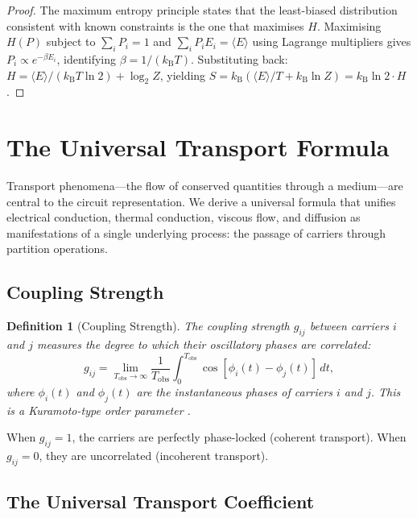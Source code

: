 \documentclass[twocolumn,10pt]{article}
\newtheorem{definition}[theorem]{Definition}
\theoremstyle{remark}
\newcommand{\kB}{k_{\mathrm{B}}}
\begin{document}
\begin{proof}
The maximum entropy principle \cite{jaynes1957a,jaynes1957b} states that the least-biased distribution consistent with known constraints is the one that maximises $H$.  Maximising $H(P)$ subject to $\sum_i P_i = 1$ and $\sum_i P_i E_i = \langle E \rangle$ using Lagrange multipliers gives $P_i \propto e^{-\beta E_i}$, identifying $\beta = 1/(\kB T)$.  Substituting back: $H = \langle E \rangle / (\kB T \ln 2) + \log_2 Z$, yielding $S = \kB (\langle E \rangle / T + \kB \ln Z) = \kB \ln 2 \cdot H$.
\end{proof}


\section{The Universal Transport Formula}
\label{sec:transport}

Transport phenomena---the flow of conserved quantities through a medium---are central to the circuit representation.  We derive a universal formula that unifies electrical conduction, thermal conduction, viscous flow, and diffusion as manifestations of a single underlying process: the passage of carriers through partition operations.

\subsection{Coupling Strength}

\begin{definition}[Coupling Strength]
\label{def:coupling}
The \emph{coupling strength} $g_{ij}$ between carriers $i$ and $j$ measures the degree to which their oscillatory phases are correlated:
\begin{equation}
    g_{ij} = \lim_{T_{\text{obs}} \to \infty} \frac{1}{T_{\text{obs}}} \int_0^{T_{\text{obs}}} \cos[\phi_i(t) - \phi_j(t)] \, dt,
    \label{eq:coupling_strength}
\end{equation}
where $\phi_i(t)$ and $\phi_j(t)$ are the instantaneous phases of carriers $i$ and $j$.  This is a Kuramoto-type order parameter \cite{kuramoto1984}.
\end{definition}

When $g_{ij} = 1$, the carriers are perfectly phase-locked (coherent transport).  When $g_{ij} = 0$, they are uncorrelated (incoherent transport).

\subsection{The Universal Transport Coefficient}
\end{document}
